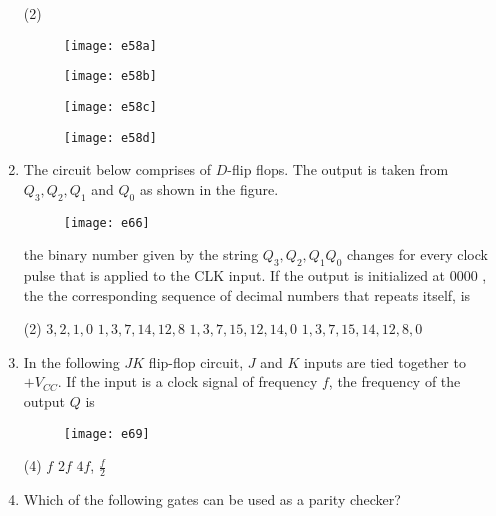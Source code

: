 \begin{enumerate}
	{	}
	\begin{tasks}(2)
		\task[\textbf{A.}] \begin{figure}[H]
			\centering
			\texttt{[image: e58a]}
		\end{figure}
		\task[\textbf{B.}] \begin{figure}[H]
			\centering
			\texttt{[image: e58b]}
		\end{figure}
		\task[\textbf{C.}] \begin{figure}[H]
			\centering
			\texttt{[image: e58c]}
		\end{figure}
		\task[\textbf{D.}] \begin{figure}[H]
			\centering
			\texttt{[image: e58d]}
		\end{figure}
	\end{tasks}
	\item The circuit below comprises of $D$-flip flops. The output is taken from $Q_{3}, Q_{2}, Q_{1}$ and $Q_{0}$ as shown in the figure.\\
	\begin{figure}[H]
		\centering
		\texttt{[image: e66]}
	\end{figure}
	the binary number given by the string $Q_{3}, Q_{2}, Q_{1} Q_{0}$ changes for every clock pulse that is applied to the CLK input. If the output is initialized at 0000 , the the corresponding sequence of decimal numbers that repeats itself, is
	{	}
	\begin{tasks}(2)
		\task[\textbf{A.}] $3,2,1,0$
		\task[\textbf{B.}] $1,3,7,14,12,8$
		\task[\textbf{C.}] $1,3,7,15,12,14,0$
		\task[\textbf{D.}] $1,3,7,15,14,12,8,0$
	\end{tasks}
	\item In the following $J K$ flip-flop circuit, $J$ and $K$ inputs are tied together to $+V_{C C} .$ If the input is a clock signal of frequency $f$, the frequency of the output $Q$ is
	{	}
	\begin{figure}[H]
		\centering
		\texttt{[image: e69]}
	\end{figure}
	\begin{tasks}(4)
		\task[\textbf{A.}] $f$
		\task[\textbf{B.}] $2 f$
		\task[\textbf{C.}] $4 f$,
		\task[\textbf{D.}] $\frac{f}{2}$
	\end{tasks}
	\item Which of the following gates can be used as a parity checker?

\end{enumerate}

